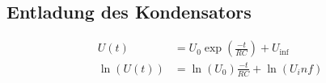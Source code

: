 \subsection{Entladung des Kondensators}

\begin{align}
    U(t)&= U_0 \exp(\frac{-t}{RC}) + U_{\inf} \\
    \ln(U(t)) &= \ln(U_0) \frac{-t}{RC} + \ln(U_inf)
\end{align}